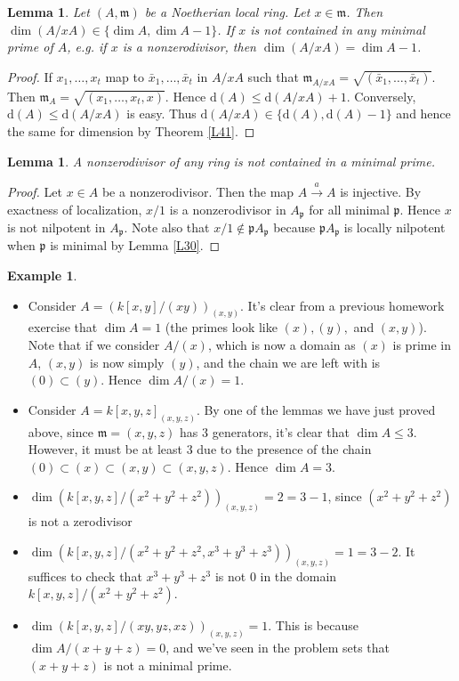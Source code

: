 \documentclass{article}
\newcommand{\fr}{\mathfrak}
\theoremstyle{plain}
\newtheorem{lem}[thm]{Lemma}
\theoremstyle{definition}
\newtheorem{exmp}{Example}
\theoremstyle{remark}
\begin{document}
\begin{lem}
\label{L46}
Let $(A,\fr m)$ be a Noetherian local ring. Let $x\in\fr m$. Then $\dim(A/xA)\in\{\dim A,\dim A-1\}$. If $x$ is not contained in any minimal prime of $A$, e.g. if $x$ is a nonzerodivisor, then $\dim(A/xA)=\dim A-1$.
\end{lem}
\begin{proof}
If $x_1,\ldots,x_t$ map to $\bar x_1,\ldots,\bar x_t$ in $A/xA$ such that $\fr m_{A/xA}=\sqrt{(\bar x_1,\ldots, \bar x_t)}$. Then $\fr m_A=\sqrt{(x_1,\ldots,x_t,x)}$. Hence $\text{d}(A)\leq\text{d}(A/xA)+1$. Conversely, $\text{d}(A)\leq \text{d}(A/xA)$ is easy. Thus $\text{d}(A/xA)\in\{\text{d}(A),\text{d}(A)-1\}$ and hence the same for dimension by Theorem \ref{L41}.
\end{proof}

\begin{lem}
\label{L47}
A nonzerodivisor of any ring is not contained in a minimal prime.
\end{lem}
\begin{proof}
Let $x\in A$ be a nonzerodivisor. Then the map $A\overset{a}{\to}A$ is injective. By exactness of localization, $x/1$ is a nonzerodivisor in $A_\fr p$ for all minimal $\fr p$. Hence $x$ is not nilpotent in $A_\fr p$. Note also that $x/1\notin\fr p A_\fr p$ because $\fr pA_\fr p$ is locally nilpotent when $\fr p$ is minimal by Lemma \ref{L30}.
\end{proof}

\begin{exmp}\hspace{1mm}
\begin{itemize}

\item Consider $A=\left(k[x,y]/(xy)\right)_{(x,y)}$. It's clear from a previous homework exercise that $\dim A=1$ (the primes look like $(x),(y),$ and $(x,y)$). Note that if we consider $A/(x)$, which is now a domain as $(x)$ is prime in $A$, $(x,y)$ is now simply $(y)$, and the chain we are left with is $(0)\subset (y)$. Hence $\dim A/(x)=1$.
\item Consider $A=k[x,y,z]_{(x,y,z)}$. By one of the lemmas we have just proved above, since $\fr m=(x,y,z)$ has 3 generators, it's clear that $\dim A\leq 3$. However, it must be at least 3 due to the presence of the chain $(0)\subset (x)\subset (x,y)\subset (x,y,z)$. Hence $\dim A=3$.

\item $\dim \left(k[x,y,z]/(x^2 + y^2 + z^2) \right)_{(x,y,z)} = 2 = 3-1$, since $(x^2 + y^2 + z^2)$ is not a zerodivisor
\item $\dim \left(k[x,y,z]/(x^2 + y^2 + z^2, x^3 + y^3 + z^3) \right)_{(x,y,z)} = 1 = 3-2$. It suffices to check that $x^3 + y^3 + z^3$ is not $0$ in the domain $k[x,y,z]/(x^2 + y^2 + z^2)$.
\item $\dim \left( k[x,y,z]/(xy, yz, xz) \right)_{(x,y,z)} = 1$. This is because $\dim A/(x+y+z) = 0$, and we've seen in the problem sets that $(x+y+z)$ is not a minimal prime.
\end{itemize}
\end{exmp}
\end{document}
